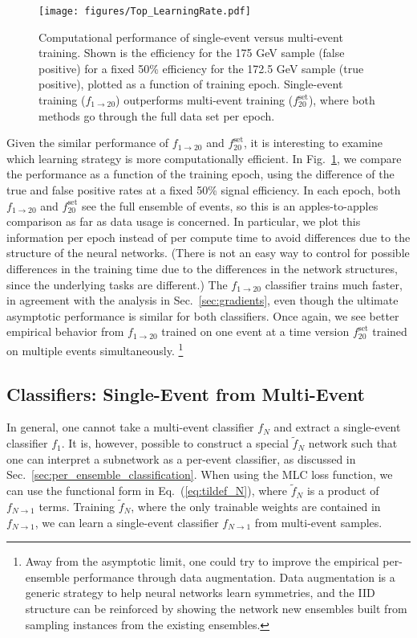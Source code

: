 \documentclass[aps,prx,reprint,preprintnumbers,superscriptaddress,nofootinbib,longbibliography,floatfix]{revtex4-2}
\DeclareRobustCommand{\Sec}[1]{Sec.~\ref{sec:#1}}
\DeclareRobustCommand{\Fig}[1]{Fig.~\ref{fig:#1}}
\DeclareRobustCommand{\Eq}[1]{Eq.~(\ref{eq:#1})}
\begin{document}
 \begin{figure}[t]
 \centering
 \texttt{[image: figures/Top\_LearningRate.pdf]}
 \caption{Computational performance of single-event versus multi-event training.
 Shown is the efficiency for the 175 GeV sample (false positive) for a fixed 50\% efficiency for the 172.5 GeV sample (true positive), plotted as a function of training epoch.
 Single-event training ($f_{1 \to 20}$) outperforms multi-event training ($f_{20}^\text{set}$), where both methods go through the full data set per epoch.
 }
 \label{fig:top2}
 \end{figure}

 Given the similar performance of $f_{1\rightarrow 20}$ and $f_{20}^\text{set}$, it is interesting to examine which learning strategy is more computationally efficient.
In \Fig{top2}, we compare the performance as a function of the training epoch, using the difference of the true and false positive rates at a fixed 50\% signal efficiency. 
 In each epoch, both $f_{1\rightarrow 20}$ and $f_{20}^\text{set}$ see the full ensemble of events, so this is an apples-to-apples comparison as far as data usage is concerned.
  In particular, we plot this information per epoch instead of per compute time to avoid differences due to the structure of the neural networks.
  (There is not an easy way to control for possible differences in the training time due to the differences in the network structures, since the underlying tasks are different.) 
 The $f_{1\rightarrow 20}$ classifier trains much faster, in agreement with the analysis in \Sec{gradients}, even though the ultimate asymptotic performance is similar for both classifiers.
%
Once again, we see better empirical behavior from $f_{1 \to 20}$ trained on one event at a time version $f_{20}^{\text{set}}$ trained on multiple events simultaneously.%
%
\footnote{Away from the asymptotic limit, one could try to improve the empirical per-ensemble performance through data augmentation.  Data augmentation is a generic strategy to help neural networks learn symmetries, and the IID structure can be reinforced by showing the network new ensembles built from sampling instances from the existing ensembles.}


\subsection{Classifiers: Single-Event from Multi-Event}
\label{sec:onefrommany}

In general, one cannot take a multi-event classifier $f_N$ and extract a single-event classifier $f_1$.
%
It is, however, possible to construct a special $\tilde{f}_N$ network such that one can interpret a subnetwork as a per-event classifier, as discussed in \Sec{per_ensemble_classification}.
%
When using the MLC loss function, we can use the functional form in \Eq{tildef_N}, where $\tilde{f}_N$ is a product of $f_{N \to 1}$ terms.
%
Training $\tilde{f}_N$, where the only trainable weights are contained in $f_{N \to 1}$, we can learn a single-event classifier $f_{N \to 1}$ from multi-event samples.
\end{document}
